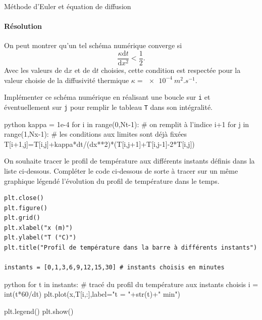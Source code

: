 \begin{exo}[3][python]{Méthode d'Euler et équation de diffusion}
      \paragraph{Résolution}
      On peut montrer qu'un tel schéma numérique converge si $$\frac{\kappa \mathrm{d} t}{\mathrm{d} x^2}<\frac{1}{2}.$$ Avec les valeurs de $\mathrm{d} x$ et de $\mathrm{d} t$ choisies, cette condition est respectée pour la valeur choisie de la diffusivité thermique $\kappa=\SI{e-4}{m^2.s^{-1}}$.
      \begin{questions}
        \item	Implémenter ce schéma numérique en réalisant une boucle sur \texttt{i} et éventuellement sur \texttt{j} pour remplir le tableau \texttt{T} dans son intégralité.
\begin{mintedSolution}{python}
kappa = 1e-4
for i in range(0,Nt-1): # on remplit à l'indice i+1
  for j in range(1,Nx-1): # les conditions aux limites sont déjà fixées
    T[i+1,j]=T[i,j]+kappa*dt/(dx**2)*(T[i,j+1]+T[i,j-1]-2*T[i,j])
\end{mintedSolution}
        \item On souhaite tracer le profil de température aux différents instants définis dans la liste ci-dessous. Compléter le code ci-dessous de sorte à tracer sur un même graphique légendé l'évolution du profil de température dans le temps.
\begin{verbatim}
plt.close()
plt.figure()
plt.grid()
plt.xlabel("x (m)")
plt.ylabel("T (°C)")
plt.title("Profil de température dans la barre à différents instants")

instants = [0,1,3,6,9,12,15,30] # instants choisis en minutes
\end{verbatim}

\begin{mintedSolution}{python}
for t in instants: # tracé du profil du température aux instants choisis
  i = int(t*60/dt)
  plt.plot(x,T[i,:],label="t = "+str(t)+" min")
  
plt.legend()
plt.show()
\end{mintedSolution}

\end{questions}
\end{exo}
